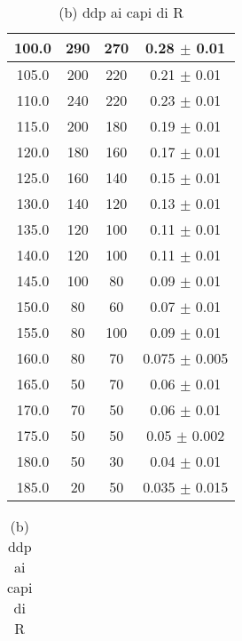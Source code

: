 \documentclass[a4paper]{article}
\theoremstyle{definition}
\begin{document}
\begin{table}[!htbp]
{\begin{minipage}{.5\linewidth}
\begin{tabular}{c|cc|c}
        100.0 & 290& 270 & 0.28 \(\pm\) 0.01\\
        \hline
        105.0 & 200& 220 & 0.21 \(\pm\) 0.01\\
        \hline
        110.0 & 240& 220 & 0.23 \(\pm\) 0.01\\
        \hline
        115.0 & 200 &180 & 0.19 \(\pm\) 0.01\\
        \hline
        120.0 & 180 &160 & 0.17 \(\pm\) 0.01\\
        \hline
        125.0 & 160 &140 & 0.15 \(\pm\) 0.01\\
        \hline
        130.0 & 140 &120 & 0.13 \(\pm\) 0.01\\
        \hline
        135.0 & 120 &100 & 0.11 \(\pm\) 0.01\\
        \hline
        140.0 & 120 &100 & 0.11 \(\pm\) 0.01\\
        \hline
        145.0 & 100 &80 & 0.09 \(\pm\) 0.01\\
        \hline 
        150.0 & 80& 60 & 0.07 \(\pm\) 0.01\\
        \hline
        155.0 & 80& 100 & 0.09 \(\pm\) 0.01\\
        \hline
        160.0 & 80& 70 & 0.075 \(\pm\) 0.005\\
        \hline
        165.0 & 50 &70 & 0.06 \(\pm\) 0.01\\
        \hline
        170.0 & 70 &50 & 0.06 \(\pm\) 0.01\\
        \hline
        175.0 & 50 &50 & 0.05 \(\pm\) 0.002\\
        \hline
        180.0 & 50& 30 & 0.04 \(\pm\) 0.01\\
        \hline
        185.0 & 20& 50 & 0.035 \(\pm\) 0.015\\
       \hline
       \hline
    \end{tabular}
    \end{minipage}%
    \begin{minipage}{.7\linewidth}
      \centering
         \captionsetup{labelformat=empty}
    	 \caption{(b) ddp ai capi di R}
            \begin{tabular}{c|cc|c}


\end{tabular}
\end{minipage}}
\end{table}
\end{document}
